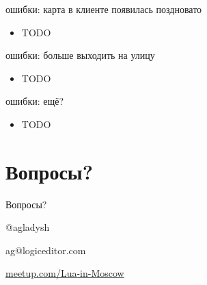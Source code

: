 \documentclass[aspectratio=169,handout,bigger]{beamer}
\begin{document}

\begin{frame}{ошибки: карта в клиенте появилась поздновато}
  \begin{itemize}
    \item TODO
  \end{itemize}
\end{frame}


\begin{frame}{ошибки: больше выходить на улицу}
  \begin{itemize}
    \item TODO
  \end{itemize}
\end{frame}


\begin{frame}{ошибки: ещё?}
  \begin{itemize}
    \item TODO
  \end{itemize}
\end{frame}


\section{Вопросы?}

\begin{frame}{Вопросы?}

\begin{center}
\Huge{@agladysh}
\end{center}

\begin{center}
\Large{ag@logiceditor.com}
\end{center}

\begin{center}
\href{http://meetup.com/Lua-in-Moscow}{meetup.com/Lua-in-Moscow}
\end{center}

\end{frame}

\end{document}

